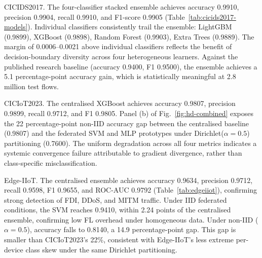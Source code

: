 \documentclass[sensors,article,submit,pdftex,moreauthors]{Definitions/mdpi}
\begin{document}
CICIDS2017. The four-classifier stacked ensemble achieves accuracy 0.9910, precision 0.9904, recall 0.9910, and F1-score 0.9905 (Table~\ref{tab:cicids2017-models}). Individual classifiers consistently trail the ensemble: LightGBM (0.9899), XGBoost (0.9898), Random Forest (0.9903), Extra Trees (0.9889). The margin of 0.0006--0.0021 above individual classifiers reflects the benefit of decision-boundary diversity across four heterogeneous learners. Against the published research baseline (accuracy 0.9400, F1 0.9500), the ensemble achieves a 5.1 percentage-point accuracy gain, which is statistically meaningful at 2.8 million test flows.

CICIoT2023. The centralised XGBoost achieves accuracy 0.9807, precision 0.9899, recall 0.9712, and F1 0.9805. Panel (b) of Fig.~\ref{fig:hd-combined} exposes the 22 percentage-point non-IID accuracy gap between the centralised baseline (0.9807) and the federated SVM and MLP prototypes under Dirichlet($\alpha{=}0.5$) partitioning (0.7600). The uniform degradation across all four metrics indicates a systemic convergence failure attributable to gradient divergence, rather than class-specific misclassification.

Edge-IIoT. The centralised ensemble achieves accuracy 0.9634, precision 0.9712, recall 0.9598, F1 0.9655, and ROC-AUC 0.9792 (Table~\ref{tab:edgeiiot}), confirming strong detection of FDI, DDoS, and MITM traffic. Under IID federated conditions, the SVM reaches 0.9410, within 2.24 points of the centralised ensemble, confirming low FL overhead under homogeneous data. Under non-IID ($\alpha{=}0.5$), accuracy falls to 0.8140, a 14.9 percentage-point gap. This gap is smaller than CICIoT2023's 22\%, consistent with Edge-IIoT's less extreme per-device class skew under the same Dirichlet partitioning.
\end{document}
